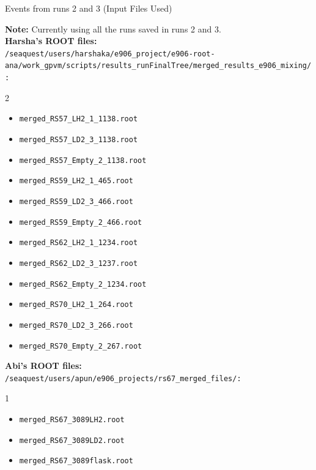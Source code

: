 \documentclass[aspectratio=169]{beamer}
\begin{document}
\begin{frame}{Events from runs 2 and 3 (Input Files Used)}
    
\textbf{Note:} Currently using all the runs saved in runs 2 and 3.
\vspace{0.3cm}
\tiny\\
\textbf{Harsha's ROOT files:} \\
\texttt{/seaquest/users/harshaka/e906\_project/e906-root-ana/work\_gpvm/scripts/results\_runFinalTree/merged\_results\_e906\_mixing/:}
\begin{multicols}{2}
\begin{itemize}
    \item \texttt{merged\_RS57\_LH2\_1\_1138.root}
    \item \texttt{merged\_RS57\_LD2\_3\_1138.root}
    \item \texttt{merged\_RS57\_Empty\_2\_1138.root}
    \item \texttt{merged\_RS59\_LH2\_1\_465.root}
    \item \texttt{merged\_RS59\_LD2\_3\_466.root}
    \item \texttt{merged\_RS59\_Empty\_2\_466.root}
    \item \texttt{merged\_RS62\_LH2\_1\_1234.root}
    \item \texttt{merged\_RS62\_LD2\_3\_1237.root}
    \item \texttt{merged\_RS62\_Empty\_2\_1234.root}
    \item \texttt{merged\_RS70\_LH2\_1\_264.root}
    \item \texttt{merged\_RS70\_LD2\_3\_266.root}
    \item \texttt{merged\_RS70\_Empty\_2\_267.root}
\end{itemize}
\end{multicols}
\textbf{Abi's ROOT files:} \\
\texttt{/seaquest/users/apun/e906\_projects/rs67\_merged\_files/:}
\begin{multicols}{1}
\begin{itemize}
    \item \texttt{merged\_RS67\_3089LH2.root}
    \item \texttt{merged\_RS67\_3089LD2.root}
    \item \texttt{merged\_RS67\_3089flask.root}
\end{itemize}
\end{multicols}

\normalsize

\end{frame}
\end{document}
